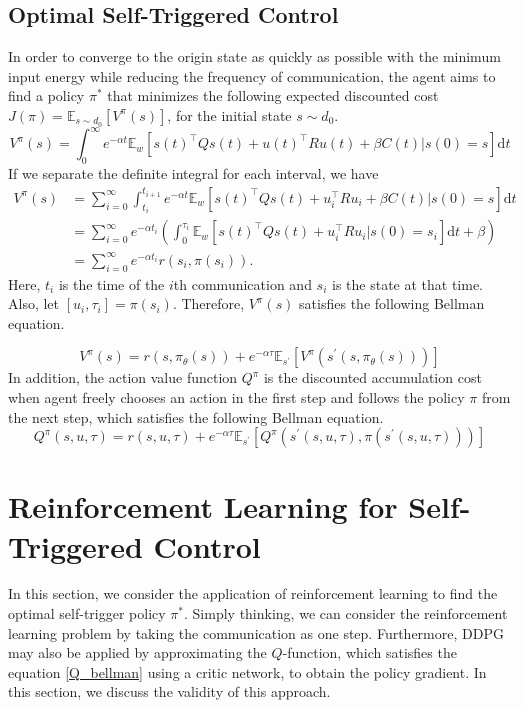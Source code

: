 \documentclass[english, dvipdfmx]{ampmt}             %
\newcommand{\expect}{\mathbb{E}}
\begin{document}
\subsection{Optimal Self-Triggered Control}
In order to converge to the origin state as quickly as possible with the minimum input energy while reducing the frequency of communication, the agent aims to find a policy $\pi^{*}$ that minimizes the following expected discounted cost $J(\pi)=\expect_{s\sim d_0}[V^{\pi}(s)]$, for the initial state $s\sim d_0$.
\begin{equation}
	V^{\pi}(s) = \int_{0}^{\infty} e^{-\alpha t}\expect_{w}[s(t)^{\top}Qs(t)+u(t)^{\top}Ru(t)+\beta C(t)|s(0)=s]\textrm{d}t
\end{equation}
If we separate the definite integral for each interval, we have 
\begin{align}
	V^{\pi}(s) &= \sum_{i=0}^{\infty}\int_{t_i}^{t_{i+1}} e^{-\alpha t}\expect_{w}[s(t)^{\top}Qs(t)+u_i^{\top}Ru_i+\beta C(t)|s(0)=s]\textrm{d}t \nonumber \\
			 &= \sum_{i=0}^{\infty} e^{-\alpha t_i} (\int_{0}^{\tau_i}\expect_{w}[s(t)^{\top}Qs(t)+u_i^{\top}Ru_i|s(0)=s_i]\textrm{d}t + \beta) \nonumber \\
			 &= \sum_{i=0}^{\infty} e^{-\alpha t_i} r(s_i, \pi(s_i)) \label{self_acc_reward}.
\end{align}
Here, $t_i$ is the time of the $i$th communication and $s_i$ is the state at that time. Also, let $[u_i, \tau_i]=\pi(s_i)$. Therefore, $V^{\pi}(s)$ satisfies the following Bellman equation. \par
\begin{equation}
	V^{\pi}(s) = r(s,\pi_{\theta}(s)) + e^{-\alpha\tau}\expect_{s^{\prime}}[V^{\pi}(s^{\prime}(s,\pi_{\theta}(s)))] \label{bellman}
\end{equation}
In addition, the action value function $Q^{\pi}$ is the discounted accumulation cost when agent freely chooses an action in the first step and follows the policy $\pi$ from the next step, which satisfies the following Bellman equation.
\begin{equation}
	Q^{\pi}(s,u,\tau) = r(s,u,\tau) + e^{-\alpha\tau}\expect_{s^{\prime}}[Q^{\pi}(s^{\prime}(s,u,\tau), \pi(s^{\prime}(s,u,\tau)))] \label{Q_bellman}
\end{equation}

\section{Reinforcement Learning for Self-Triggered Control}
In this section, we consider the application of reinforcement learning to find the optimal self-trigger policy $\pi^{*}$. Simply thinking, we can consider the reinforcement learning problem by taking the communication as one step. Furthermore, DDPG may also be applied by approximating the $Q$-function, which satisfies the equation \eqref{Q_bellman} using a critic network, to obtain the policy gradient. In this section, we discuss the validity of this approach.
\end{document}
